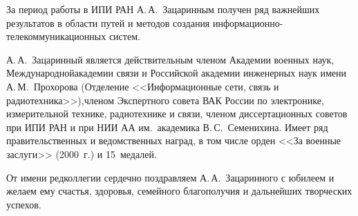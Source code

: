 \begin{multicols}{2}
     За период работы в ИПИ РАН А.\,А.~Зацаринным получен ряд 
важнейших результатов в области путей и методов создания 
     ин\-фор\-ма\-ци\-он\-но-те\-ле\-ком\-му\-ни\-ка\-ци\-он\-ных систем.
     
     А.\,А.~Зацаринный является действительным членом Академии 
военных наук, Международной\linebreak академии связи и Российской академии 
инженерных наук имени А.\,М.~Прохорова (Отделение <<Информационные 
сети, связь и радиотехника>>),\linebreak членом Экспертного совета ВАК России по 
электронике, измерительной технике, радиотехнике и связи, членом 
диссертационных советов при ИПИ РАН и при НИИ АА им.\ академика 
В.\,С.~Семенихина. Имеет ряд правительственных и ведомственных наград, 
в том числе орден <<За военные заслуги>> (2000~г.) и 15~медалей. 

\label{end\stat}

     \bigskip
     От имени редколлегии сердечно поздравляем А.\,А.~Зацаринного с 
юбилеем и желаем ему счастья, здоровья, семейного благополучия и 
дальнейших творческих успехов. 
\end{multicols}  


